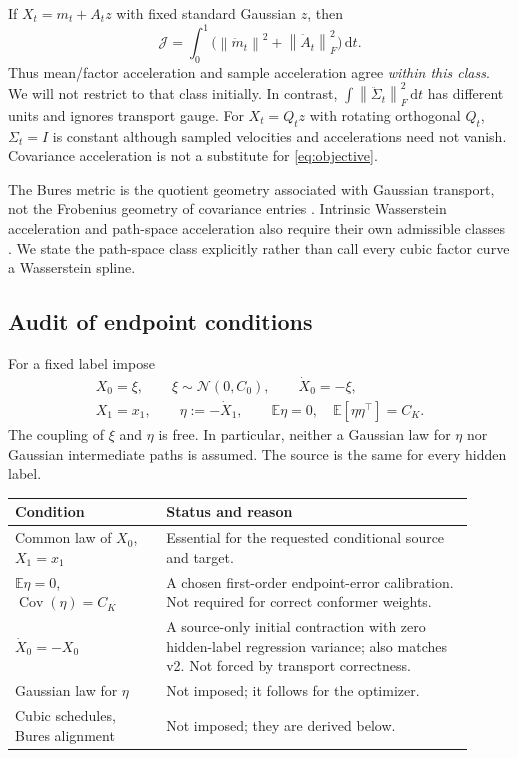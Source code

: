 \documentclass[11pt,letterpaper]{article}
\newcommand{\E}{\mathbb E}
\newcommand{\cN}{\mathcal N}
\newcommand{\Cov}{\operatorname{Cov}}
\newcommand{\dd}{\,\mathrm d}
\newcommand{\norm}[1]{\left\lVert#1\right\rVert}
\newcommand{\J}{\mathcal J}
\begin{document}
If $X_t=m_t+A_tz$ with fixed standard Gaussian $z$, then
\begin{equation}
\J=\int_0^1\bigl(\norm{\ddot m_t}^2+\norm{\ddot A_t}_F^2\bigr)\dd t.
\label{eq:factor-objective}
\end{equation}
Thus mean/factor acceleration and sample acceleration agree \emph{within this class}. We will not restrict to that class initially. In contrast, $\int\norm{\ddot\Sigma_t}_F^2\dd t$ has different units and ignores transport gauge. For $X_t=Q_tz$ with rotating orthogonal $Q_t$, $\Sigma_t=I$ is constant although sampled velocities and accelerations need not vanish. Covariance acceleration is not a substitute for \eqref{eq:objective}.

The Bures metric is the quotient geometry associated with Gaussian transport, not the Frobenius geometry of covariance entries \cite{bhatia}. Intrinsic Wasserstein acceleration and path-space acceleration also require their own admissible classes \cite{benamou,chen}. We state the path-space class explicitly rather than call every cubic factor curve a Wasserstein spline.

\subsection{Audit of endpoint conditions}
For a fixed label impose
\begin{equation}
\boxed{\begin{gathered}
X_0=\xi,\qquad \xi\sim\cN(0,C_0),\qquad \dot X_0=-\xi,\\
X_1=x_1,\qquad \eta:=-\dot X_1,\qquad
\E\eta=0,\quad\E[\eta\eta^\top]=C_K.
\end{gathered}}
\label{eq:boundary}
\end{equation}
The coupling of $\xi$ and $\eta$ is free. In particular, neither a Gaussian law for $\eta$ nor Gaussian intermediate paths is assumed. The source is the same for every hidden label.

\begin{center}\small
\begin{tabular}{p{0.30\linewidth}p{0.61\linewidth}}
\toprule
Condition & Status and reason\\\midrule
Common law of $X_0$, $X_1=x_1$ & Essential for the requested conditional source and target.\\
$\E\eta=0$, $\Cov(\eta)=C_K$ & A chosen first-order endpoint-error calibration. Not required for correct conformer weights.\\
$\dot X_0=-X_0$ & A source-only initial contraction with zero hidden-label regression variance; also matches v2. Not forced by transport correctness.\\
Gaussian law for $\eta$ & Not imposed; it follows for the optimizer.\\
Cubic schedules, Bures alignment & Not imposed; they are derived below.\\
\bottomrule
\end{tabular}
\end{center}
\end{document}
